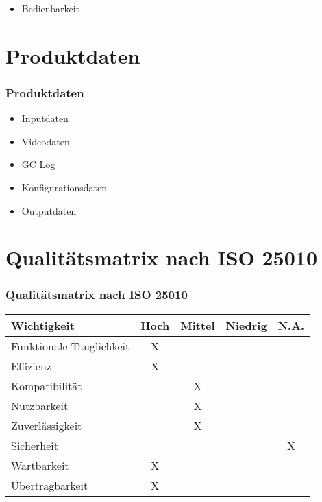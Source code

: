 \documentclass[12pt, xcolor=table]{beamer}
\begin{document}
\begin{frame}
	\begin{itemize}
		\item Bedienbarkeit
	\end{itemize}
\end{frame}

\section{Produktdaten}
\begin{frame}
	\frametitle{Produktdaten}
	\begin{itemize}
		\item Inputdaten
		\item Videodaten
	\end{itemize}
\end{frame}

\begin{frame}
	\begin{itemize}
		\item GC Log
		\item Konfigurationsdaten
		\item Outputdaten
	\end{itemize}
\end{frame}

\section{Qualitätsmatrix nach ISO 25010}
\begin{frame}
	\frametitle{Qualitätsmatrix nach ISO 25010}
	\begin{center}
	\small
	\begin{tabularx}{\framewidth}{X|cccc}
		Wichtigkeit&Hoch&Mittel&Niedrig&N.A.\\
		\hline Funktionale Tauglichkeit&X&&& \\
		Effizienz&X&&& \\
		Kompatibilität&&X&& \\
		Nutzbarkeit&&X&& \\
		Zuverlässigkeit&&X&& \\
		Sicherheit&&&&X \\
		Wartbarkeit&X&&& \\
		Übertragbarkeit&X&&& \\
	\end{tabularx}
	\end{center}
\end{frame}
\end{document}
